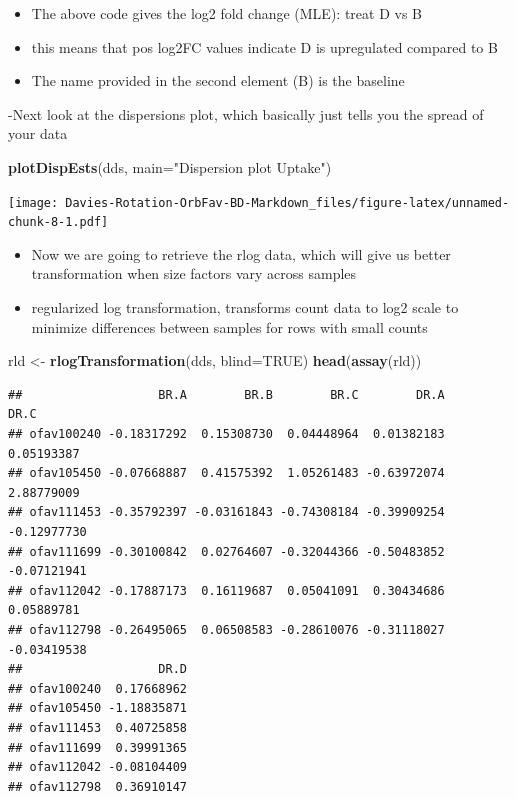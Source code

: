 \documentclass[
]{article}
\newenvironment{Shaded}{\begin{snugshade}}{\end{snugshade}}
\newcommand{\DataTypeTok}[1]{\textcolor[rgb]{0.13,0.29,0.53}{#1}}
\newcommand{\KeywordTok}[1]{\textcolor[rgb]{0.13,0.29,0.53}{\textbf{#1}}}
\newcommand{\NormalTok}[1]{#1}
\newcommand{\OtherTok}[1]{\textcolor[rgb]{0.56,0.35,0.01}{#1}}
\newcommand{\StringTok}[1]{\textcolor[rgb]{0.31,0.60,0.02}{#1}}
\providecommand{\tightlist}{%
  \setlength{\itemsep}{0pt}\setlength{\parskip}{0pt}}
\begin{document}
\begin{itemize}
\tightlist
\item
  The above code gives the log2 fold change (MLE): treat D vs B
\item
  this means that pos log2FC values indicate D is upregulated compared
  to B
\item
  The name provided in the second element (B) is the baseline
\end{itemize}

-Next look at the dispersions plot, which basically just tells you the
spread of your data

\begin{Shaded}
\begin{Highlighting}[]
\KeywordTok{plotDispEsts}\NormalTok{(dds, }\DataTypeTok{main=}\StringTok{"Dispersion plot Uptake"}\NormalTok{)}
\end{Highlighting}
\end{Shaded}

\texttt{[image: Davies-Rotation-OrbFav-BD-Markdown\_files/figure-latex/unnamed-chunk-8-1.pdf]}

\begin{itemize}
\tightlist
\item
  Now we are going to retrieve the rlog data, which will give us better
  transformation when size factors vary across samples
\item
  regularized log transformation, transforms count data to log2 scale to
  minimize differences between samples for rows with small counts
\end{itemize}

\begin{Shaded}
\begin{Highlighting}[]
\NormalTok{rld <-}\StringTok{ }\KeywordTok{rlogTransformation}\NormalTok{(dds, }\DataTypeTok{blind=}\OtherTok{TRUE}\NormalTok{)}
\KeywordTok{head}\NormalTok{(}\KeywordTok{assay}\NormalTok{(rld))}
\end{Highlighting}
\end{Shaded}

\begin{verbatim}
##                   BR.A        BR.B        BR.C        DR.A        DR.C
## ofav100240 -0.18317292  0.15308730  0.04448964  0.01382183  0.05193387
## ofav105450 -0.07668887  0.41575392  1.05261483 -0.63972074  2.88779009
## ofav111453 -0.35792397 -0.03161843 -0.74308184 -0.39909254 -0.12977730
## ofav111699 -0.30100842  0.02764607 -0.32044366 -0.50483852 -0.07121941
## ofav112042 -0.17887173  0.16119687  0.05041091  0.30434686  0.05889781
## ofav112798 -0.26495065  0.06508583 -0.28610076 -0.31118027 -0.03419538
##                   DR.D
## ofav100240  0.17668962
## ofav105450 -1.18835871
## ofav111453  0.40725858
## ofav111699  0.39991365
## ofav112042 -0.08104409
## ofav112798  0.36910147
\end{verbatim}
\end{document}
